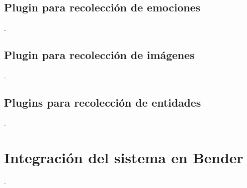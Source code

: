 \subsection{Plugin para recolección de emociones}
.


\subsection{Plugin para recolección de imágenes}
.


\subsection{Plugins para recolección de entidades}
.


\section{Integración del sistema en Bender}

.
